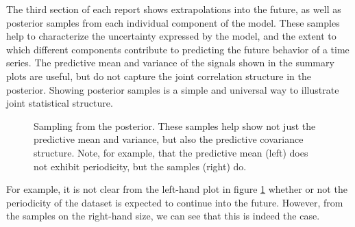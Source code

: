 \documentclass[twoside]{article}
\begin{document}
The third section of each report shows extrapolations into the future, as well as posterior samples from each individual component of the model.  These samples help to characterize the uncertainty expressed by the model, and the extent to which different components contribute to predicting the future behavior of a time series.
%
The predictive mean and variance of the signals shown in the summary plots are useful, but do not capture the joint correlation structure in the posterior.  Showing posterior samples is a simple and universal way to illustrate joint statistical structure.
%
\begin{figure}[ht]
\centering
{}
\caption{Sampling from the posterior.  These samples help show not just the predictive mean and variance, but also the predictive covariance structure.  Note, for example, that the predictive mean (left) does not exhibit periodicity, but the samples (right) do.}
\label{fig:extrap-full}
\end{figure}
%
For example,
it is not clear from the left-hand plot in figure \ref{fig:extrap-full} whether or not the periodicity of the dataset is expected to continue into the future.  However, from the samples on the right-hand size, we can see that this is indeed the case.  

\end{document}
